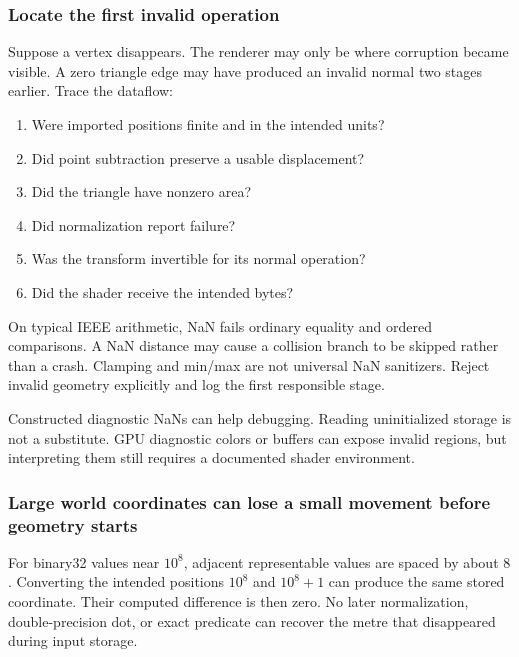\subsubsection{Locate the first invalid operation}\label{02-foundations-ii-ch037-locate-the-first-invalid-operation}

\hypertarget{02-foundations-ii-ch037-locate-the-first-invalid-operation}{}

Suppose a vertex disappears. The renderer may only be where corruption became visible. A zero triangle edge may have produced an invalid normal two stages earlier. Trace the dataflow:

\begin{enumerate}
\def\labelenumi{\arabic{enumi}.}
\tightlist
\item
  Were imported positions finite and in the intended units?
\item
  Did point subtraction preserve a usable displacement?
\item
  Did the triangle have nonzero area?
\item
  Did normalization report failure?
\item
  Was the transform invertible for its normal operation?
\item
  Did the shader receive the intended bytes?
\end{enumerate}

On typical IEEE arithmetic, NaN fails ordinary equality and ordered comparisons. A NaN distance may cause a collision branch to be skipped rather than a crash. Clamping and min/max are not universal NaN sanitizers. Reject invalid geometry explicitly and log the first responsible stage.

Constructed diagnostic NaNs can help debugging. Reading uninitialized storage is not a substitute. GPU diagnostic colors or buffers can expose invalid regions, but interpreting them still requires a documented shader environment.

\subsubsection{Large world coordinates can lose a small movement before geometry starts}\label{02-foundations-ii-ch037-large-world-coordinates-can-lose-a-small-movement-before-geometry-starts}

\hypertarget{02-foundations-ii-ch037-large-world-coordinates-can-lose-a-small-movement-before-geometry-starts}{}

For binary32 values near \(10^8\), adjacent representable values are spaced by about \(8\). Converting the intended positions \(10^8\) and \(10^8+1\) can produce the same stored coordinate. Their computed difference is then zero. No later normalization, double-precision dot, or exact predicate can recover the metre that disappeared during input storage.


